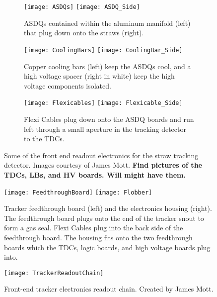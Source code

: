 \begin{figure}[]
\centering
    \begin{subfigure}[t]{1\textwidth}
    \centering
        \texttt{[image: ASDQs]}
    \hspace{1mm}
        \texttt{[image: ASDQ\_Side]}
    \caption{ASDQs contained within the aluminum manifold (left) that plug down onto the straws (right).}
    \label{fig:ASDQs}
    \end{subfigure}
    \begin{subfigure}[t]{1\textwidth}
    \centering
        \texttt{[image: CoolingBars]}
    \hspace{1mm}
        \texttt{[image: CoolingBar\_Side]}
    \caption{Copper cooling bars (left) keep the ASDQs cool, and a high voltage spacer (right in white) keep the high voltage components isolated.}
    \end{subfigure}
    \begin{subfigure}[t]{1\textwidth}
    \centering
        \texttt{[image: Flexicables]}
    \hspace{1mm}
        \texttt{[image: Flexicable\_Side]}
    \caption{Flexi Cables plug down onto the ASDQ boards and run left through a small aperture in the tracking detector to the TDCs.}
    \label{fig:flexis}
    \end{subfigure}
\caption[Tracker front end readout electronics]{Some of the front end readout electronics for the straw tracking detector. Images courtesy of James Mott. \bf{Find pictures of the TDCs, LBs, and HV boards. Will might have them.}}
\label{fig:FrontEndElectronics}
\end{figure}


\begin{figure}[]
    \centering
        \texttt{[image: FeedthroughBoard]}
    \hspace{1mm}
        \texttt{[image: Flobber]}
    \caption[Tracker feedthough board and electronics housing]{Tracker feedthrough board (left) and the electronics housing (right). The feedthrough board plugs onto the end of the tracker snout to form a gas seal. Flexi Cables plug into the back side of the feedthrough board. The housing fits onto the two feedthrough boards which the TDCs, logic boards, and high voltage boards plug into.}
    \label{fig:FeedthroughAndHousing}
\end{figure}



\begin{figure}[]
    \centering
    \texttt{[image: TrackerReadoutChain]}
    \caption[Tracker electronics readout chain]{Front-end tracker electronics readout chain. Created by James Mott.}   
    \label{fig:TrackerReadoutChain}
\end{figure}


\cleardoublepage

